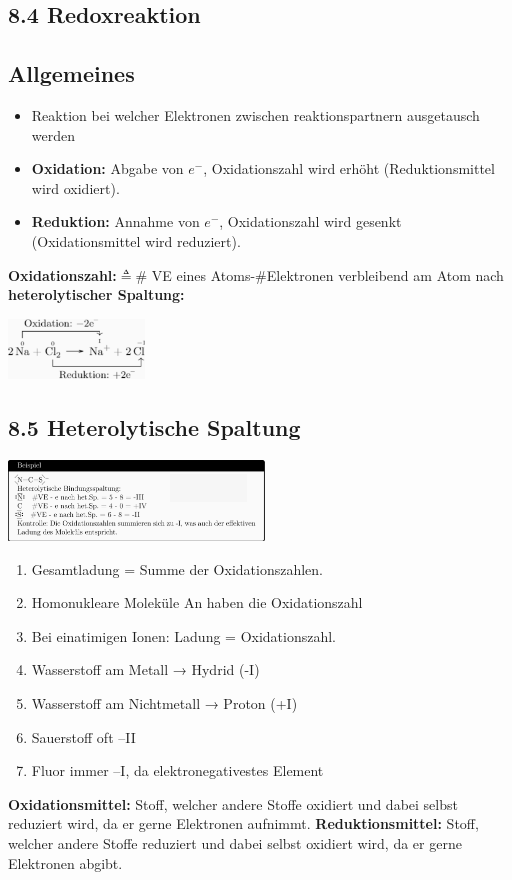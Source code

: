 \begin{multicols*}{4}
\section{8.4 Redoxreaktion}
\subsection{Allgemeines}{
    \begin{itemize}[noitemsep,leftmargin=*]
        \item Reaktion bei welcher Elektronen zwischen reaktionspartnern ausgetausch werden
        \item \textbf{Oxidation:} Abgabe von $e^-$, Oxidationszahl wird erhöht (Reduktionsmittel wird oxidiert).
        \item \textbf{Reduktion:} Annahme von $e^-$, Oxidationszahl wird gesenkt (Oxidationsmittel wird reduziert).
    \end{itemize}
    \textbf{Oxidationszahl:}$\triangleq$\# VE eines Atoms-\#Elektronen verbleibend am 
    Atom nach \textbf{heterolytischer Spaltung:}\par
    \centering
    \includegraphics[height=16mm]{Bilder/Redox.PNG} 
    }


\subsection{8.5 Heterolytische Spaltung}{
    \includegraphics[width=68mm]{Bilder/HeterolytischeSpaltung.PNG}
    \begin{enumerate}[noitemsep,leftmargin=*]
        \item Gesamtladung = Summe der Oxidationszahlen.
        \item Homonukleare Moleküle An haben die Oxidationszahl
        \item Bei einatimigen Ionen: Ladung = Oxidationszahl.
        \item Wasserstoff am Metall → Hydrid (-I)
        \item Wasserstoff am Nichtmetall → Proton (+I)
        \item Sauerstoff oft –II
        \item Fluor immer –I, da elektronegativestes Element
    \end{enumerate}
    \textbf{Oxidationsmittel:} Stoff, welcher andere Stoffe oxidiert und dabei selbst reduziert wird, da er gerne Elektronen aufnimmt.
    \textbf{Reduktionsmittel:} Stoff, welcher andere Stoffe reduziert und dabei selbst oxidiert wird, da er gerne Elektronen abgibt.
}

\end{multicols*}
